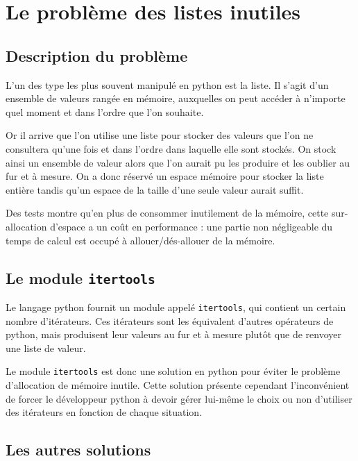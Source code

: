 \documentclass[a4paper]{article}
\begin{document}
\section*{Le problème des listes inutiles}

\subsection*{Description du problème}

L'un des type les plus souvent manipulé en python est la liste. Il
s'agit d'un ensemble de valeurs rangée en mémoire, auxquelles on peut
accéder à n'importe quel moment et dans l'ordre que l'on souhaite.

Or il arrive que l'on utilise une liste pour stocker des valeurs que
l'on ne consultera qu'une fois et dans l'ordre dans laquelle elle sont
stockés. On stock ainsi un ensemble de valeur alors que l'on aurait pu
les produire et les oublier au fur et à mesure. On a donc réservé un
espace mémoire pour stocker la liste entière tandis qu'un espace de la
taille d'une seule valeur aurait suffit.

Des tests montre qu'en plus de consommer inutilement de la mémoire,
cette sur-allocation d'espace a un coût en performance : une partie non
négligeable du temps de calcul est occupé à allouer/dés-allouer de la
mémoire.

\subsection*{Le module \texttt{itertools}}

Le langage python fournit un module appelé \texttt{itertools}, qui contient un
certain nombre d'itérateurs. Ces itérateurs sont les équivalent
d'autres opérateurs de python, mais produisent leur valeurs au fur et
à mesure plutôt que de renvoyer une liste de valeur.

Le module \texttt{itertools} est donc une solution en python pour éviter le
problème d'allocation de mémoire inutile. Cette solution présente
cependant l'inconvénient de forcer le développeur python à devoir
gérer lui-même le choix ou non d'utiliser des itérateurs en fonction
de chaque situation. 

\subsection*{Les autres solutions }
\end{document}
